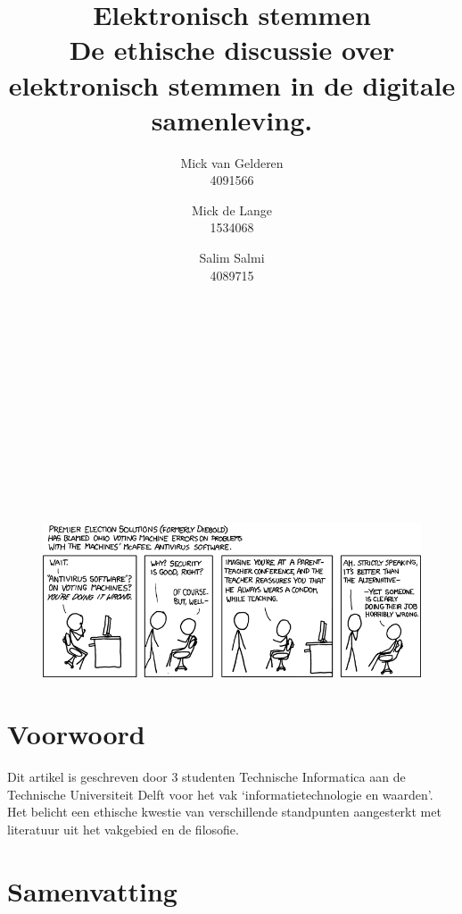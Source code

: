 \documentclass[a4paper]{article}
\title{Elektronisch stemmen \\ \large De ethische discussie over elektronisch stemmen in de digitale samenleving.}
\author{
Mick van Gelderen \\ 4091566 \and 
Mick de Lange \\ 1534068 \and
Salim Salmi \\ 4089715
}
\begin{document}
\thispagestyle{plain}
\maketitle

\hfill \\ \\ \\ \\ \\ \\ \\ \\ \\ \\
\begin{figure}[htp]
\centering
\includegraphics[width=\textwidth]{media/voting_machines.png}
\label{fig:voting-machines}

\end{figure}

\newpage

\thispagestyle{plain}

\section*{Voorwoord}
Dit artikel is geschreven door 3 studenten Technische Informatica aan de Technische Universiteit Delft voor het vak `informatietechnologie en waarden'.
Het belicht een ethische kwestie van verschillende standpunten aangesterkt met literatuur uit het vakgebied en de filosofie. 

\section*{Samenvatting}

\newpage
\end{document}
